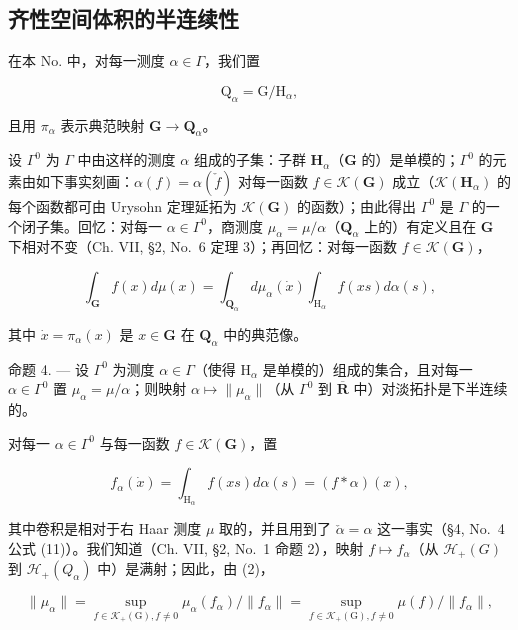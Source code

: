 \subsection{齐性空间体积的半连续性}

在本 No. 中，对每一测度 \(\alpha \in \Gamma\)，我们置

\[
\mathrm{Q} _ {\alpha} = \mathrm{G} / \mathrm{H} _ {\alpha},\tag{1}
\]

且用 \(\pi_{\alpha}\) 表示典范映射 \(\mathbf{G} \to \mathbf{Q}_{\alpha}\)。

设 \(\Gamma^0\) 为 \(\Gamma\) 中由这样的测度 \(\alpha\) 组成的子集：子群 \(\mathbf{H}_{\alpha}\)（\(\mathbf{G}\) 的）是单模的；\(\Gamma^0\) 的元素由如下事实刻画：\(\alpha(f) = \alpha(\check{f})\) 对每一函数 \(f \in \mathcal{K}(\mathbf{G})\) 成立（\(\mathcal{K}(\mathbf{H}_{\alpha})\) 的每个函数都可由 Urysohn 定理延拓为 \(\mathcal{K}(\mathbf{G})\) 的函数）；由此得出 \(\Gamma^0\) 是 \(\Gamma\) 的一个闭子集。回忆：对每一 \(\alpha \in \Gamma^0\)，商测度 \(\mu_{\alpha} = \mu / \alpha\)（\(\mathbf{Q}_{\alpha}\) 上的）有定义且在 \(\mathbf{G}\) 下相对不变（Ch. VII, §2, No.~6 定理 3）；再回忆：对每一函数 \(f \in \mathcal{K}(\mathbf{G})\)，

\[
\int_ {\mathbf {G}} f (x) d \mu (x) = \int_ {\mathbf {Q} _ {\alpha}} d \mu_ {\alpha} (\dot {x}) \int_ {\mathrm{H} _ {\alpha}} f (x s) d \alpha (s),\tag{2}
\]

其中 \(\dot{x} = \pi_{\alpha}(x)\) 是 \(x\in \mathbf{G}\) 在 \(\mathbf{Q}_{\alpha}\) 中的典范像。

命题 4. --- 设 \(\Gamma^0\) 为测度 \(\alpha \in \Gamma\)（使得 \(\mathrm{H}_{\alpha}\) 是单模的）组成的集合，且对每一 \(\alpha \in \Gamma^0\) 置 \(\mu_{\alpha} = \mu / \alpha\)；则映射 \(\alpha \mapsto \| \mu_{\alpha} \|\)（从 \(\Gamma^0\) 到 \(\overline{\mathbf{R}}\) 中）对淡拓扑是下半连续的。

对每一 \(\alpha \in \Gamma^0\) 与每一函数 \(f\in \mathcal{K}(\mathbf{G})\)，置

\[
f _ {\alpha} (\dot {x}) = \int_ {\mathrm{H} _ {\alpha}} f (x s) d \alpha (s) = (f * \alpha) (x),
\]

其中卷积是相对于右 Haar 测度 \(\mu\) 取的，并且用到了 \(\check{\alpha} = \alpha\) 这一事实（§4, No.~4 公式 (11)）。我们知道（Ch. VII, §2, No.~1 命题 2），映射 \(f \mapsto f_{\alpha}\)（从 \(\mathcal{H}_{+}(G)\) 到 \(\mathcal{H}_{+}(Q_{\alpha})\) 中）是满射；因此，由 (2)，

\[
\| \mu_ {\alpha} \| = \sup _ {f \in \mathcal {K} _ {+} (\mathrm{G}), f \neq 0} \mu_ {\alpha} (f _ {\alpha}) / \| f _ {\alpha} \| = \sup _ {f \in \mathcal {K} _ {+} (\mathrm{G}), f \neq 0} \mu (f) / \| f _ {\alpha} \|,
\]


